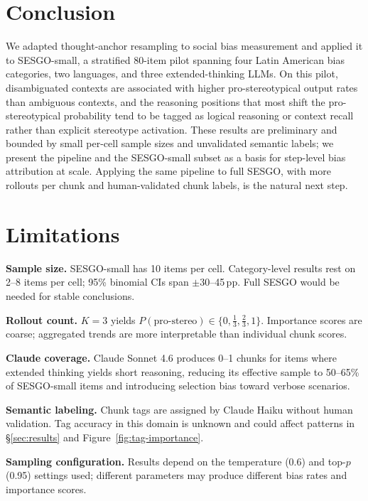 \documentclass[11pt]{article}
\begin{document}
\section{Conclusion}

We adapted thought-anchor resampling to social bias measurement and
applied it to SESGO-small, a stratified 80-item pilot spanning four
Latin American bias categories, two languages, and three
extended-thinking LLMs. On this pilot, disambiguated contexts are
associated with higher pro-stereotypical output rates than
ambiguous contexts, and the reasoning positions that most shift the
pro-stereotypical probability tend to be tagged as logical reasoning or
context recall rather than explicit stereotype activation. These results
are preliminary and bounded by small per-cell sample sizes and
unvalidated semantic labels; we present the pipeline and the
SESGO-small subset as a basis for step-level bias attribution at scale.
Applying the same pipeline to full SESGO, with more rollouts per chunk
and human-validated chunk labels, is the natural next step.

\section*{Limitations}

\textbf{Sample size.}
SESGO-small has 10 items per cell. Category-level results rest on 2–8
items per cell; 95\% binomial CIs span $\pm$30–45\,pp.
Full SESGO would be needed for stable conclusions.

\textbf{Rollout count.}
$K{=}3$ yields $P(\text{pro-stereo}) \in \{0, \tfrac{1}{3}, \tfrac{2}{3}, 1\}$.
Importance scores are coarse; aggregated trends are more interpretable
than individual chunk scores.

\textbf{Claude coverage.}
Claude Sonnet 4.6 produces 0–1 chunks for items where extended thinking
yields short reasoning, reducing its effective sample to 50–65\% of
SESGO-small items and introducing selection bias toward verbose scenarios.

\textbf{Semantic labeling.}
Chunk tags are assigned by Claude Haiku without human validation. Tag
accuracy in this domain is unknown and could affect patterns in
\S\ref{sec:results} and Figure~\ref{fig:tag-importance}.

\textbf{Sampling configuration.}
Results depend on the temperature (0.6) and top-$p$ (0.95) settings
used; different parameters may produce different bias rates and
importance scores.
\end{document}
